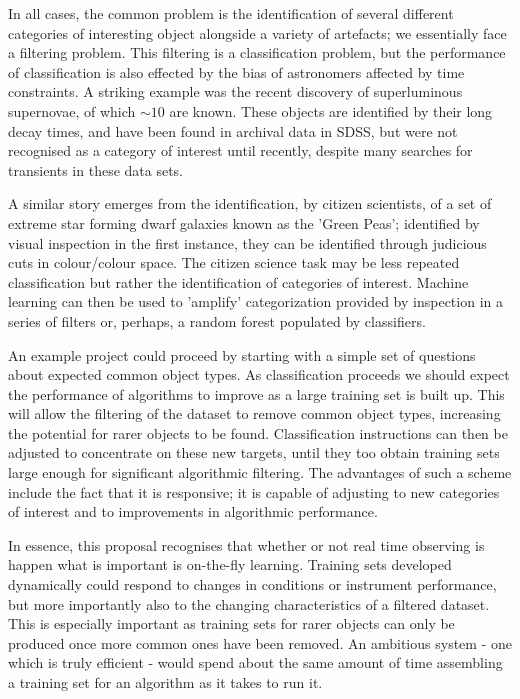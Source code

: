 In all cases, the common problem is the identification of several different categories of interesting object alongside a variety of artefacts; we essentially face a filtering problem. This filtering is a classification problem, but the performance of classification is also effected by the bias of astronomers affected by time constraints. A striking example was the recent discovery of superluminous supernovae, of which $\sim 10$ are known. These objects are identified by their long decay times, and have been found in archival data in SDSS, but were not recognised as a category of interest until recently, despite many searches for transients in these data sets. 

A similar story emerges from the identification, by citizen scientists, of a set of extreme star forming dwarf galaxies known as the 'Green Peas'; identified by visual inspection in the first instance, they can be identified through judicious cuts in colour/colour space. The citizen science task may be less repeated classification but rather the identification of categories of interest. Machine learning can then be used to 'amplify' categorization provided by inspection in a series of filters or, perhaps, a random forest populated by classifiers. 

An example project could proceed by starting with a simple set of questions about expected common object types. As classification proceeds we should expect the performance of algorithms to improve as a large training set is built up. This will allow the filtering of the dataset to remove common object types, increasing the potential for rarer objects to be found. Classification instructions can then be adjusted to concentrate on these new targets, until they too obtain training sets large enough for significant algorithmic filtering. The advantages of such a scheme include the fact that it is responsive; it is capable of adjusting to new categories of interest and to improvements in algorithmic performance. 

In essence, this proposal recognises that whether or not real time observing is happen what is important is on-the-fly learning. Training sets developed dynamically could respond to changes in conditions or instrument performance, but more importantly also to the changing characteristics of a filtered dataset. This is especially important as training sets for rarer objects can only be produced once more common ones have been removed. An ambitious system - one which is truly efficient - would spend about the same amount of time assembling a training set for an algorithm as it takes to run it. 

